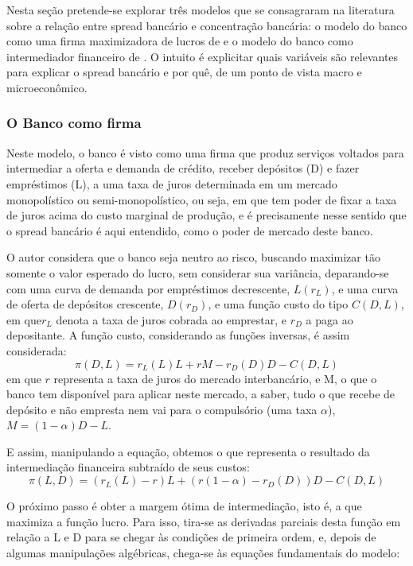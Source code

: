 \documentclass[a4paper, article, 12pt, openany, oneside, english, brazil]{abntex2}
\begin{document}
    Nesta seção pretende-se explorar três modelos que se consagraram na literatura sobre a relação entre spread bancário e concentração bancária: o modelo do banco como uma firma maximizadora de lucros de  e o modelo do banco como intermediador financeiro de . O intuito é explicitar quais variáveis são relevantes para explicar o spread bancário e por quê, de um ponto de vista macro e microeconômico.

\subsubsection{O Banco como firma}

    Neste modelo, o banco é visto como uma firma que produz serviços voltados para intermediar a oferta e demanda de crédito, receber depósitos (D) e fazer empréstimos (L), a uma taxa de juros determinada em um mercado monopolístico ou semi-monopolístico, ou seja, em que tem poder de fixar a taxa de juros acima do custo marginal de produção, e é precisamente nesse sentido que o spread bancário é aqui entendido, como o poder de mercado deste banco. \cite{oreiro}

    O autor considera que o banco seja neutro ao risco, buscando maximizar tão somente o valor esperado do lucro, sem considerar sua variância, deparando-se com uma curva de demanda por empréstimos decrescente, $L(r_L)$, e uma curva de oferta de depósitos crescente, $D(r_D)$, e uma função custo do tipo $C(D, L)$, em que$ r_L$ denota a taxa de juros cobrada ao emprestar, e $r_D$ a paga ao depositante. A função custo, considerando as funções inversas, é assim considerada: \begin{equation}\pi(D, L) = r_L(L)L + rM - r_D(D)D - C(D, L)\end{equation} em que $r$ representa a taxa de juros do mercado interbancário, e M, o que o banco tem disponível para aplicar neste mercado, a saber, tudo o que recebe de depósito e não empresta nem vai para o compulsório (uma taxa $\alpha$), $M = (1 - \alpha)D - L$.

    E assim, manipulando a equação, obtemos o que representa o resultado da intermediação financeira subtraído de seus custos: \begin{equation}\pi(L, D) = (r_L(L) - r)L + (r(1 - \alpha) - r_D(D))D - C(D, L)\end{equation}

    O próximo passo é obter a margem ótima de intermediação, isto é, a que maximiza a função lucro. Para isso, tira-se as derivadas parciais desta função em relação a L e D para se chegar às condições de primeira ordem, e, depois de algumas manipulações algébricas, chega-se às equações fundamentais do modelo:
\end{document}
